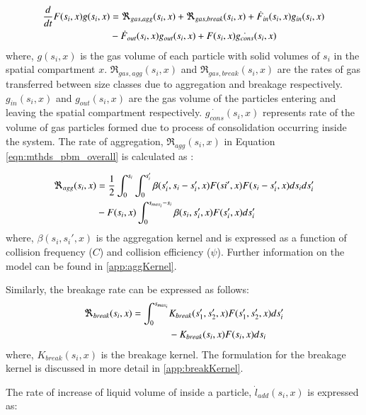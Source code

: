 \documentclass[preprint,10pt,authoryear,review]{elsarticle}
\begin{document}
\begin{align}
\frac{d}{dt}F(s_i,x)g(s_i,x)&= 
\Re_{gas,agg}(s_i,x)+\Re_{gas,break}(s_i,x)+\dot{F}_{in}(s_i,x)g_{in}(s_i,x)\notag\\
&-\dot{F}_{out}(s_i,x)g_{out}(s_i,x)+F(s_i,x)\dot{g_{cons}}(s_i,x)
\label{eqn:mthds_pbm_gas_agg} 
\end{align}
where, $g(s_i,x)$ is the gas volume of each particle with solid volumes of $s_i$ 
in the spatial compartment $x$. $\Re_{gas,agg}(s_i,x)$ and $\Re_{gas,break}(s_i,x)$ are 
the rates of gas transferred between size classes due to aggregation and 
breakage respectively. 
$g_{in}(s_i,x)$ and $g_{out}(s_i,x)$ are the gas volume of the particles entering and 
leaving the spatial compartment respectively. $\dot{g_{cons}}(s_i,x)$ represents 
rate of the volume of 
gas particles formed due to process of consolidation occurring inside the system. The 
rate of aggregation, $\Re_{agg}(s_i,x)$ in Equation \ref{eqn:mthds_pbm_overall} is 
calculated as \citep{Chaturbedi2017}:

\begin{align}
\Re_{agg}(s_i,x)&= \frac{1}{2}\int _0^{s_i} \int _0^{s_i'} 
\beta(s_i',s_i-s_i',x)F(si',x)F(s_i-s_i',x)ds_ids_i'\notag\\ 
&- F(s_i,x)\int _0^{s_{max_i}-s_i} 
\beta(s_i,s_i',x)F(s_i',x)ds_i'
\label{eqn:mthds_R_agg}
\end{align}
where, $\beta(s_i, s_i',x)$ is the aggregation kernel and is expressed as a 
function of collision frequency ($C$) and collision efficiency ($\psi$). Further 
information on the model can be found in \ref{app:aggKernel}.

Similarly, the breakage rate can be expressed as follows:
\begin{align}
\Re_{break}(s_i,x)  = \int_0^{s_{max_i}} & \notag
K_{break}(s_1',s_2',x)F(s_1',s_2',x)ds_i' \\ &  - K_{break}(s_i,x)F(s_i,x)ds_i
\label{eqn:mthds_pbm_breakage_geneq}
\end{align}   
where, $K_{break}(s_i,x)$ is the breakage kernel. The formulation for the breakage 
kernel is discussed in more detail in \ref{app:breakKernel}.

The rate of increase of liquid volume of inside a particle, 
$\dot{l}_{add}(s_i,x)$ is expressed as:
\end{document}
